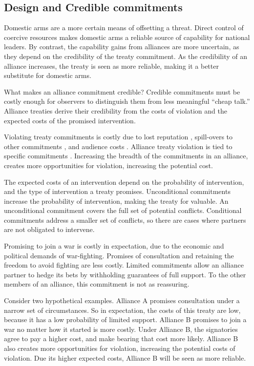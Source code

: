 \documentclass[12pt]{article}
\begin{document}
\subsection*{Design and Credible commitments}

Domestic arms are a more certain means of offsetting a threat. Direct control of coercive resources makes domestic arms a reliable source of capability for national leaders. By contrast, the capability gains from alliances are more uncertain, as they depend on the credibility of the treaty commitment. As the credibility of an alliance increases, the treaty is seen as more reliable, making it a better substitute for domestic arms. 

What makes an alliance commitment credible? Credible commitments must be costly enough for observers to distinguish them from less meaningful ``cheap talk.'' Alliance treaties derive their credibility from the costs of violation and the expected costs of the promised intervention. 

Violating treaty commitments is costly due to lost reputation \citep{Gibler2008}, spill-overs to other commitments \citep{Crescenzi2012}, and audience costs \citep{Fearon1997, Tomz2007ar, Chibaetal2015, Levyetal2015}. Alliance treaty violation is tied to specific commitments \citep{Leedsetal2000}. Increasing the breadth of the commitments in an alliance, creates more opportunities for violation, increasing the potential cost. 

The expected costs of an intervention depend on the probability of intervention, and the type of intervention a treaty promises. Unconditional commitments increase the probability of intervention, making the treaty for valuable. An unconditional commitment covers the full set of potential conflicts. Conditional commitments address a smaller set of conflicts, so there are cases where partners are not obligated to intervene. 

Promising to join a war is costly in expectation, due to the economic and political demands of war-fighting. Promises of consultation and retaining the freedom to avoid fighting are less costly. Limited commitments allow an alliance partner to hedge its bets by withholding guarantees of full support. To the other members of an alliance, this commitment is not as reassuring.

Consider two hypothetical examples. Alliance A promises consultation under a narrow set of circumstances. So in expectation, the costs of this treaty are low, because it has a low probability of limited support. Alliance B promises to join a war no matter how it started is more costly. Under Alliance B, the signatories agree to pay a higher cost, and make bearing that cost more likely. Alliance B also creates more opportunities for violation, increasing the potential costs of violation. Due its higher expected costs, Alliance B will be seen as more reliable.  
\end{document}
